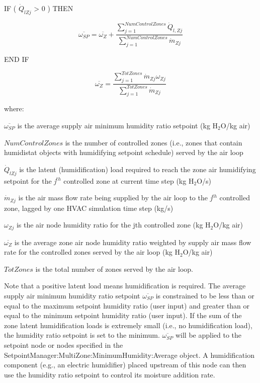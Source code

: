 IF ( \({\dot Q_{lZj}}\) \textgreater{} 0 ) THEN

\begin{equation}
  \overline{{\omega}_{SP}} = \overline{{\omega}_Z} + \frac{\sum\limits_{j = 1}^{NumControlZones}\dot{Q}_{l,Zj}}{\sum\limits_{j = 1}^{NumControlZones}\dot{m}_{Zj}}
\end{equation}

END IF

\begin{equation}
  \overline{{\omega}_{Z}} = \frac{\sum\limits_{j = 1}^{TotZones}\dot{m}_{Zj}\omega_{Zj}}{\sum\limits_{j = 1}^{TotZones}\dot{m}_{Zj}}
\end{equation}

where:

\({\overline{\omega_{SP}}}\) is the average supply air minimum humidity ratio setpoint (kg H\(_{2}\)O/kg air)

\(NumControlZones\) is the number of controlled zones (i.e., zones that contain humidistat objects with humidifying setpoint schedule) served by the air loop

\({\dot Q_{lZj}}\) is the latent (humidification) load required to reach the zone air humidifying setpoint for the \emph{j}\(^{th}\) controlled zone at current time step (kg H\(_{2}\)O/s)

\({\dot m_{Zj}}\) is the air mass flow rate being supplied by the air loop to the \emph{j}\(^{th}\) controlled zone, lagged by one HVAC simulation time step (kg/s)

\({\omega_{Zj}}\) is the air node humidity ratio for the jth controlled zone (kg H\(_{2}\)O/kg air)

\({\overline{\omega_Z}}\) is the average zone air node humidity ratio weighted by supply air mass flow rate for the controlled zones served by the air loop (kg H\(_{2}\)O/kg air)

\(TotZones\) is the total number of zones served by the air loop.

Note that a positive latent load means humidification is required. The average supply air minimum humidity ratio setpoint \({\overline{\omega_{SP}}}\) is constrained to be less than or equal to the maximum setpoint humidity ratio (user input) and greater than or equal to the minimum setpoint humidity ratio (user input). If the sum of the zone latent humidification loads is extremely small (i.e., no humidification load), the humidity ratio setpoint is set to the minimum. \({\overline{\omega_{SP}}}\) will be applied to the setpoint node or nodes specified in the SetpointManager:MultiZone:MinimumHumidity:Average object. A humidification component (e.g., an electric humidifier) placed upstream of this node can then use the humidity ratio setpoint to control its moisture addition rate.

